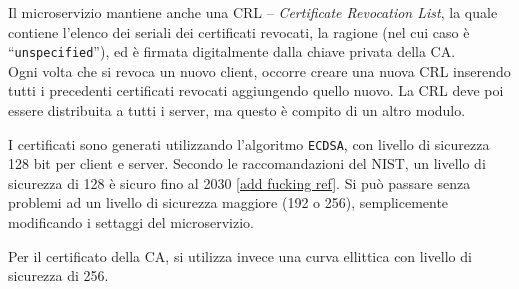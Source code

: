 Il microservizio mantiene anche una CRL -- \textit{Certificate Revocation List}, la quale
contiene l'elenco dei seriali dei certificati revocati, la ragione (nel cui caso è ``\texttt{unspecified}''),
ed è firmata digitalmente dalla chiave privata della CA.\\
Ogni volta che si revoca un nuovo client, occorre creare una nuova CRL inserendo tutti i
precedenti certificati revocati aggiungendo quello nuovo. La CRL deve poi essere distribuita 
a tutti i server, ma questo è compito di un altro modulo.

I certificati sono generati utilizzando l'algoritmo \texttt{ECDSA}, con livello di sicurezza
128 bit per client e server. Secondo le raccomandazioni del NIST, un livello di sicurezza di
128 è sicuro fino al 2030 \ref{add fucking ref}. Si può passare senza
problemi ad un livello di sicurezza maggiore (192 o 256), semplicemente modificando i settaggi
del microservizio.

Per il certificato della CA, si utilizza invece una curva ellittica con livello di sicurezza
di 256.


